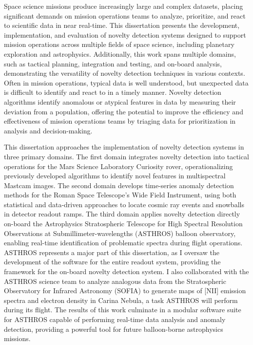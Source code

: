 Space science missions produce increasingly large and complex datasets, placing significant demands on mission operations teams to analyze, prioritize, and react to scientific data in near real-time.
This dissertation presents the development, implementation, and evaluation of novelty detection systems designed to support mission operations across multiple fields of space science, including planetary exploration and astrophysics.
Additionally, this work spans multiple domains, such as tactical planning, integration and testing, and on-board analysis, demonstrating the versatility of novelty detection techniques in various contexts.
Often in mission operations, typical data is well understood, but unexpected data is difficult to identify and react to in a timely manner.
Novelty detection algorithms identify anomalous or atypical features in data by measuring their deviation from a population, offering the potential to improve the efficiency and effectiveness of mission operations teams by triaging data for prioritization in analysis and decision-making.

This dissertation approaches the implementation of novelty detection systems in three primary domains.
The first domain integrates novelty detection into tactical operations for the Mars Science Laboratory Curiosity rover, operationalizing previously developed algorithms to identify novel features in multispectral Mastcam images.
The second domain develops time-series anomaly detection methods for the Roman Space Telescope's Wide Field Instrument, using both statistical and data-driven approaches to locate cosmic ray events and snowballs in detector readout ramps.
The third domain applies novelty detection directly on-board the Astrophysics Stratospheric Telescope for High Spectral Resolution Observations at Submillimeter-wavelengths (ASTHROS) balloon observatory, enabling real-time identification of problematic spectra during flight operations.
ASTHROS represents a major part of this dissertation, as I oversaw the development of the software for the entire readout system, providing the framework for the on-board novelty detection system.
I also collaborated with the ASTHROS science team to analyze analogous data from the Stratospheric Observatory for Infrared Astronomy (SOFIA) to generate maps of [NII] emission spectra and electron density in Carina Nebula, a task ASTHROS will perform during its flight.
The results of this work culminate in a modular software suite for ASTHROS capable of performing real-time data analysis and anomaly detection, providing a powerful tool for future balloon-borne astrophysics missions.